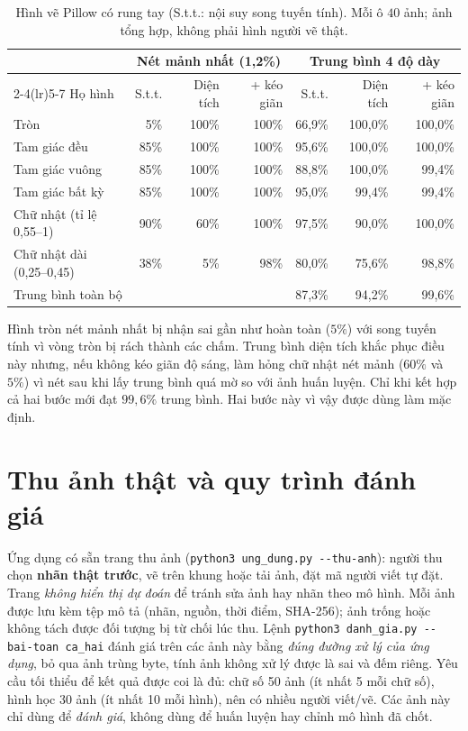 \begin{table}[H]\centering\small
\begin{tabular}{lrrrrrr}
\toprule
 & \multicolumn{3}{c}{Nét mảnh nhất (1,2\%)} & \multicolumn{3}{c}{Trung bình 4 độ dày} \\
\cmidrule(lr){2-4}\cmidrule(lr){5-7}
Họ hình & S.t.t. & Diện tích & + kéo giãn & S.t.t. & Diện tích & + kéo giãn \\
\midrule
Tròn & 5\% & 100\% & 100\% & 66,9\% & 100,0\% & 100,0\% \\
Tam giác đều & 85\% & 100\% & 100\% & 95,6\% & 100,0\% & 100,0\% \\
Tam giác vuông & 85\% & 100\% & 100\% & 88,8\% & 100,0\% & 99,4\% \\
Tam giác bất kỳ & 85\% & 100\% & 100\% & 95,0\% & 99,4\% & 99,4\% \\
Chữ nhật (tỉ lệ 0,55--1) & 90\% & 60\% & 100\% & 97,5\% & 90,0\% & 100,0\% \\
Chữ nhật dài (0,25--0,45) & 38\% & 5\% & 98\% & 80,0\% & 75,6\% & 98,8\% \\
\midrule
Trung bình toàn bộ & \multicolumn{3}{c}{} & 87,3\% & 94,2\% & 99,6\% \\
\bottomrule
\end{tabular}
\caption{Hình vẽ Pillow có rung tay (S.t.t.: nội suy song tuyến tính). Mỗi ô $40$ ảnh; ảnh tổng hợp, không phải hình người vẽ thật.}
\end{table}

Hình tròn nét mảnh nhất bị nhận sai gần như hoàn toàn ($5\%$) với song tuyến tính vì vòng tròn bị rách thành các chấm. Trung bình diện tích khắc phục điều này nhưng, nếu không kéo giãn độ sáng,
làm hỏng chữ nhật nét mảnh ($60\%$ và $5\%$) vì nét sau khi lấy trung bình quá mờ so với ảnh huấn luyện. Chỉ khi kết hợp cả hai bước mới đạt $99{,}6\%$ trung bình.
Hai bước này vì vậy được dùng làm mặc định.

\section{Thu ảnh thật và quy trình đánh giá}
\label{muc:thuanh}
Ứng dụng có sẵn trang thu ảnh (\texttt{python3 ung\_dung.py -{}-thu-anh}): người thu chọn \textbf{nhãn thật trước}, vẽ trên khung hoặc tải ảnh, đặt mã người viết tự đặt. Trang \emph{không hiển thị dự đoán}
để tránh sửa ảnh hay nhãn theo mô hình. Mỗi ảnh được lưu kèm tệp mô tả (nhãn, nguồn, thời điểm, SHA-256); ảnh trống hoặc không tách được đối tượng bị từ chối lúc thu. Lệnh
\texttt{python3 danh\_gia.py -{}-bai-toan ca\_hai} đánh giá trên các ảnh này bằng \emph{đúng đường xử lý của ứng dụng}, bỏ qua ảnh trùng byte, tính ảnh không xử lý được là sai và đếm riêng.
Yêu cầu tối thiểu để kết quả được coi là đủ: chữ số 50 ảnh (ít nhất 5 mỗi chữ số), hình học 30 ảnh (ít nhất 10 mỗi hình), nên có nhiều người viết/vẽ. Các ảnh này chỉ dùng để \emph{đánh giá},
không dùng để huấn luyện hay chỉnh mô hình đã chốt.

